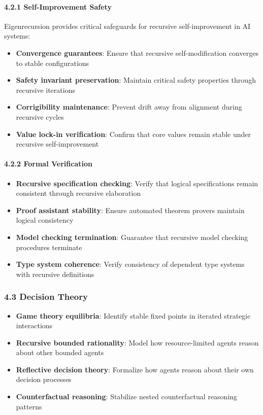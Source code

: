 \documentclass[
]{article}
\providecommand{\tightlist}{%
  \setlength{\itemsep}{0pt}\setlength{\parskip}{0pt}}
\begin{document}
\paragraph{4.2.1 Self-Improvement Safety}\label{self-improvement-safety}

Eigenrecursion provides critical safeguards for recursive
self-improvement in AI systems:

\begin{itemize}
\tightlist
\item
  \textbf{Convergence guarantees}: Ensure that recursive
  self-modification converges to stable configurations
\item
  \textbf{Safety invariant preservation}: Maintain critical safety
  properties through recursive iterations
\item
  \textbf{Corrigibility maintenance}: Prevent drift away from alignment
  during recursive cycles
\item
  \textbf{Value lock-in verification}: Confirm that core values remain
  stable under recursive self-improvement
\end{itemize}

\paragraph{4.2.2 Formal Verification}\label{formal-verification}

\begin{itemize}
\tightlist
\item
  \textbf{Recursive specification checking}: Verify that logical
  specifications remain consistent through recursive elaboration
\item
  \textbf{Proof assistant stability}: Ensure automated theorem provers
  maintain logical consistency
\item
  \textbf{Model checking termination}: Guarantee that recursive model
  checking procedures terminate
\item
  \textbf{Type system coherence}: Verify consistency of dependent type
  systems with recursive definitions
\end{itemize}

\subsubsection{4.3 Decision Theory}\label{decision-theory}

\begin{itemize}
\tightlist
\item
  \textbf{Game theory equilibria}: Identify stable fixed points in
  iterated strategic interactions
\item
  \textbf{Recursive bounded rationality}: Model how resource-limited
  agents reason about other bounded agents
\item
  \textbf{Reflective decision theory}: Formalize how agents reason about
  their own decision processes
\item
  \textbf{Counterfactual reasoning}: Stabilize nested counterfactual
  reasoning patterns
\end{itemize}
\end{document}
